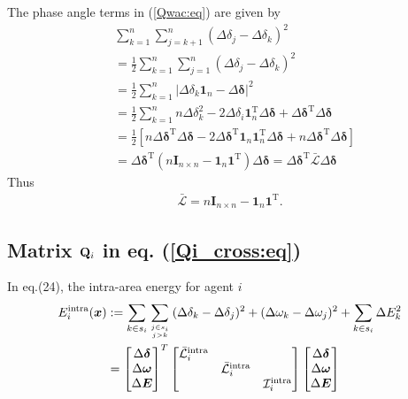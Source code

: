 \documentclass[12pt, draftclsnofoot,onecolumn]{IEEEtran}
\begin{document}
The phase angle terms in (\ref{Qwac:eq}) are given by
\begin{align}
&\sum_{k=1}^{n}\sum_{j=k+1}^{n}{(\Delta \delta_j - \Delta \delta_k)^2} \nonumber\\
&= \frac{1}{2}\sum_{k=1}^{n}\sum_{j=1}^{n}{(\Delta \delta_j - \Delta \delta_k)^2}\nonumber\\
&= \frac{1}{2}\sum_{k=1}^{n}\vert \Delta \delta_k \boldsymbol{1}_{n} -\Delta \boldsymbol{\delta} \vert^2\nonumber\\
&=\frac{1}{2} \sum_{k=1}^{n} n\Delta \delta_k^2 - 2\Delta \delta_i \boldsymbol{1}_n^{\mathrm{T}}\Delta \boldsymbol{\delta} +  \Delta \boldsymbol{\delta}^{\mathrm{T}} \Delta \boldsymbol{\delta} \nonumber\\
&= \frac{1}{2}[n \Delta \boldsymbol{\delta}^{\mathrm{T}} \Delta \boldsymbol{\delta} - 2 \Delta \boldsymbol{\delta}^{\mathrm{T}} \boldsymbol{1}_n \boldsymbol{1}_n^{\mathrm{T}} \Delta\boldsymbol{\delta} 
+ n \Delta \boldsymbol{\delta}^{\mathrm{T}} \Delta \boldsymbol{\delta}] \nonumber\\
&= \Delta \boldsymbol{\delta}^{\mathrm{T}} \left( n\boldsymbol{I}_{n\times n} - \boldsymbol{1}_n \boldsymbol{1}^{\mathrm{T}} \right)\Delta \boldsymbol{\delta} = \Delta \boldsymbol{\delta}^{\mathrm{T}} \bar{\mathcal L} \Delta \boldsymbol{\delta}
\end{align}
\noindent Thus 
\begin{align}
\bar{\mathcal L} = n\boldsymbol{I}_{n\times n} - \boldsymbol{1}_n \boldsymbol{1}^{\mathrm{T}}.
\end{align} 



\subsection{Matrix ${\bf Q}_i$ in eq. (\ref{Qi_cross:eq})}

In eq.(24), the intra-area energy for agent $i$
\begin{align}
E_i^{\mathrm{intra}}({\boldsymbol{x}}) &:= \sum_{k\in s_i}\sum_{j\in s_i \atop j>k}{(\Delta \delta_k-\Delta \delta_j)^2 +(\Delta \omega_k-\Delta \omega_j)^2} + \sum_{k\in s_i}{\Delta E_k^2}\nonumber\\
& = \begin{bmatrix}\Delta {\boldsymbol \delta}\\ \Delta {\boldsymbol \omega} \\ \Delta {\boldsymbol E}\end{bmatrix}^T
\begin{bmatrix}\bar {\mathcal L}_i^{\mathrm{intra}} & ~ &~\\
~& \bar {\mathcal L}_i^{\mathrm{intra}} & ~\\
~&~& \mathcal{I}_{i}^{\mathrm{intra}}\end{bmatrix} 
\begin{bmatrix}\Delta {\boldsymbol \delta}\\ \Delta {\boldsymbol \omega} \\ \Delta {\boldsymbol E}\end{bmatrix}
\end{align}
\end{document}
